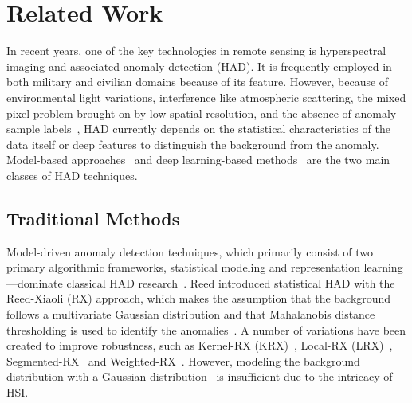 \section{Related Work}\label{sec:related}


In recent years, one of the key technologies in remote sensing is hyperspectral imaging and associated anomaly detection (HAD). It is frequently employed in both military and civilian domains because of its feature. However, because of environmental light variations, interference like atmospheric scattering, the mixed pixel problem brought on by low spatial resolution, and the absence of anomaly sample labels~\cite{keshava2002spectral,shi2014incorporating,nishii1996enhancement}, HAD currently depends on the statistical characteristics of the data itself or deep features to distinguish the background from the anomaly. Model-based approaches~\cite{schweizer_efficient_2001} and deep learning-based methods~\cite{schweizer_efficient_2001,chang2007hyperspectral,li_learning_2024,Cui2024Semi} are the two main classes of HAD techniques.


\subsection{Traditional Methods}

Model-driven anomaly detection techniques, which primarily consist of two primary algorithmic frameworks, statistical modeling and representation learning—dominate classical HAD research~\cite{su2021hyperspectral}. Reed introduced statistical HAD with the Reed-Xiaoli (RX) approach, which makes the assumption that the background follows a multivariate Gaussian distribution and that Mahalanobis distance thresholding is used to identify the anomalies~\cite{RXD,su2021hyperspectral}. A number of variations have been created to improve robustness, such as Kernel-RX (KRX)~\cite{su2021hyperspectral,kwon2005kernel}, Local-RX (LRX)~\cite{su2021hyperspectral,matteoli2010local}, Segmented-RX~\cite{su2021hyperspectral,matteoli2010improved} and Weighted-RX~\cite{su2021hyperspectral,guo2014weighted}. However, modeling the background distribution with a Gaussian distribution~\cite{matteoli2010tutorial,yang_compressive_2015,manolakis2001statistics} is insufficient due to the intricacy of HSI. 

